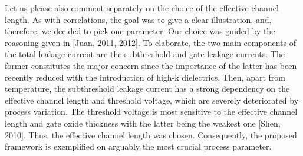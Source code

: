 \begin{authors}
Let us please also comment separately on the choice of the effective channel length.
As with correlations, the goal was to give a clear illustration, and, therefore, we decided to pick one parameter.
Our choice was guided by the reasoning given in [Juan, 2011, 2012].
To elaborate, the two main components of the total leakage current are the subthreshold and gate leakage currents.
The former constitutes the major concern since the importance of the latter has been recently reduced with the introduction of high-k dielectrics.
Then, apart from temperature, the subthreshold leakage current has a strong dependency on the effective channel length and threshold voltage, which are severely deteriorated by process variation.
The threshold voltage is most sensitive to the effective channel length and gate oxide thickness with the latter being the weakest one [Shen, 2010].
Thus, the effective channel length was chosen.
Consequently, the proposed framework is exemplified on arguably the most crucial process parameter.

\end{authors}

